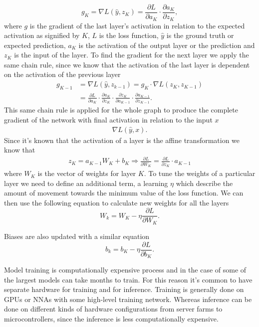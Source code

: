 \documentclass[12pt,a4paper,english
]{tunithesis}
\begin{document}
\begin{equation}
g_{K} = \nabla L (\hat{y}, z_{K}) = \frac{\partial L}{\partial a_{K}} \cdot \frac{\partial a_{K}}{\partial z_{K}},
\end{equation}
where $g$ is the gradient of the last layer's activation in relation to the expected activation as signified by $K$, $L$ is the loss function, $\hat{y}$ is the ground truth or expected prediction, $a_{K}$ is the activation of the output layer or the prediction and $z_{K}$ is the input of the layer.
To find the gradient for the next layer we apply the same chain rule, since we know that the activation of the last layer is dependent on the activation of the previous layer
\begin{align}
g_{K-1}& = \nabla L(\hat{y}, z_{k-1}) = g_{K} \cdot \nabla L(z_{K}, z_{K-1}) \\
& = \frac{\partial L}{\partial a_{K}} \cdot \frac{\partial a_{K}}{\partial z_{K}} \cdot \frac{\partial z_{K}}{\partial a_{K-1}} \cdot \frac{\partial a_{K-1}}{\partial z_{K-1}}.
\end{align}
This same chain rule is applied for the whole graph to produce the complete gradient of the network with final activation in relation to the input $x$
\begin{align}
\nabla L(\hat{y}, x).
\end{align}
Since it's known that the activation of a layer is the affine transformation we know that
\begin{align}
z_{K} = a_{K-1}W_{K} + b_{K} \Rightarrow \frac{\partial L}{\partial W_{K}} = \frac{\partial L}{\partial z_{K}} \cdot a_{K-1}
\end{align}
where $W_{K}$ is the vector of weights for layer $K$.
To tune the weights of a particular layer we need to define an additional term, a learning $\eta$ which describe the amount of movement towards the minimum value of the loss function. We can then use the following equation to calculate new weights for all the layers
\begin{equation}
W_{k} = W_{K} - \eta \frac{\partial L}{\partial W_{K}}.
\end{equation}

Biases are also updated with a similar equation
\begin{equation}
b_{k} = b_{K} - \eta \frac{\partial L}{\partial b_{K}}.
\end{equation}


Model training is computationally expensive process and in the case of some of the largest models can take months to train. For this reason it's common to have separate hardware for training and for inference. Training is generally done on GPUs or NNAs with some high-level training network. Whereas inference can be done on different kinds of hardware configurations from server farms to microcontrollers, since the inference is less computationally expensive.
\end{document}
